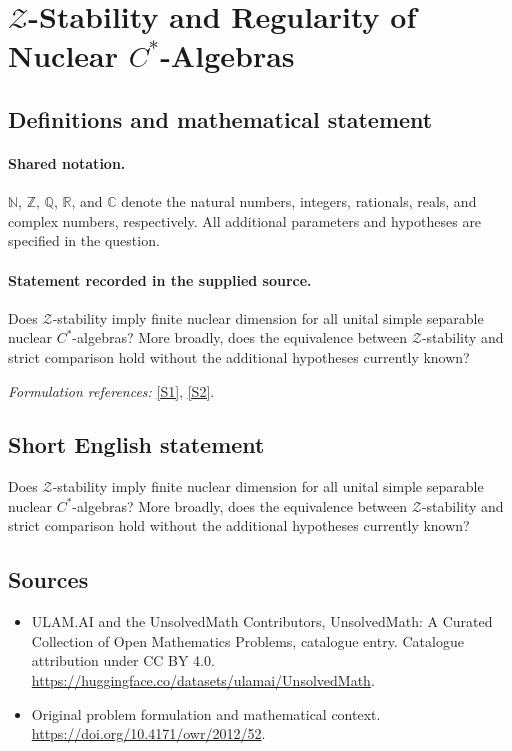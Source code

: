 \documentclass[11pt]{article}
\newcommand{\sref}[2]{\hyperlink{source:#1:#2}{[S#2]}}
\begin{document}
\section{\texorpdfstring{$\mathcal Z$-Stability and Regularity of Nuclear $C^*$-Algebras}{mathcal Z-Stability and Regularity of Nuclear C\textasciicircum{}*-Algebras}}\label{statement}

\subsection{Definitions and mathematical statement}

\paragraph{Shared notation.}$\mathbb N$, $\mathbb Z$, $\mathbb Q$, $\mathbb R$, and $\mathbb C$ denote the natural numbers, integers, rationals, reals, and complex numbers, respectively. All additional parameters and hypotheses are specified in the question.


\paragraph{Statement recorded in the supplied source.}
Does $\mathcal Z$-stability imply finite nuclear dimension for all unital simple separable nuclear $C^*$-algebras? More broadly, does the equivalence between $\mathcal Z$-stability and strict comparison hold without the additional hypotheses currently known?
\par\smallskip\textit{Formulation references:} \sref{statement}{1}, \sref{statement}{2}.
\subsection{Short English statement}
Does $\mathcal Z$-stability imply finite nuclear dimension for all unital simple separable nuclear $C^*$-algebras? More broadly, does the equivalence between $\mathcal Z$-stability and strict comparison hold without the additional hypotheses currently known?
\subsection{Sources}
\begin{itemize}
\item[\hypertarget{source:statement:1}{S1}] ULAM.AI and the UnsolvedMath Contributors, UnsolvedMath: A Curated Collection of Open Mathematics Problems, catalogue entry. Catalogue attribution under CC BY 4.0.
\url{https://huggingface.co/datasets/ulamai/UnsolvedMath}.
\item[\hypertarget{source:statement:2}{S2}] Original problem formulation and mathematical context.
\url{https://doi.org/10.4171/owr/2012/52}.
\end{itemize}
\label{end:statement}
\end{document}
